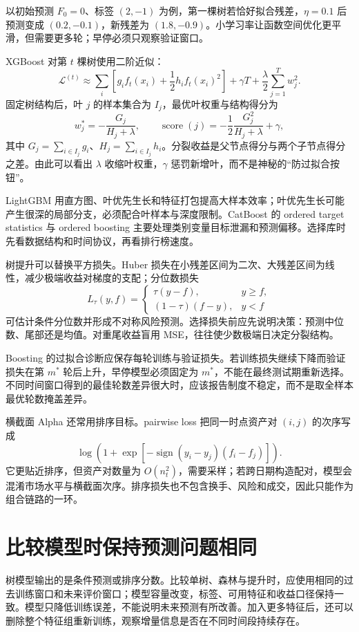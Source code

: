 

以初始预测 $F_0=0$、标签 $(2,-1)$ 为例，第一棵树若恰好拟合残差，$\eta=0.1$ 后预测变成 $(0.2,-0.1)$，新残差为 $(1.8,-0.9)$。小学习率让函数空间优化更平滑，但需要更多轮；早停必须只观察验证窗口。


XGBoost 对第 $t$ 棵树使用二阶近似\cite{chen2016xgboost}：
\[
\mathcal L^{(t)}\approx
\sum_i\left[g_i f_t(x_i)+\frac12h_i f_t(x_i)^2\right]
+\gamma T+\frac\lambda2\sum_{j=1}^T w_j^2.
\]
固定树结构后，叶 $j$ 的样本集合为 $I_j$，最优叶权重与结构得分为
\[
w_j^*=-\frac{G_j}{H_j+\lambda},\qquad
\operatorname{score}(j)=-\frac12\frac{G_j^2}{H_j+\lambda}+\gamma,
\]
其中 $G_j=\sum_{i\in I_j}g_i$、$H_j=\sum_{i\in I_j}h_i$。分裂收益是父节点得分与两个子节点得分之差。由此可以看出 $\lambda$ 收缩叶权重，$\gamma$ 惩罚新增叶，而不是神秘的“防过拟合按钮”。

LightGBM 用直方图、叶优先生长和特征打包提高大样本效率；叶优先生长可能产生很深的局部分支，必须配合叶样本与深度限制。CatBoost 的 ordered target statistics 与 ordered boosting 主要处理类别变量目标泄漏和预测偏移。选择库时先看数据结构和时间协议，再看排行榜速度。

树提升可以替换平方损失。Huber 损失在小残差区间为二次、大残差区间为线性，减少极端收益对梯度的支配；分位数损失
\[
L_\tau(y,f)=
\begin{cases}
\tau(y-f),&y\ge f,\\
(1-\tau)(f-y),&y<f
\end{cases}
\]
可估计条件分位数并形成不对称风险预测。选择损失前应先说明决策：预测中位数、尾部还是均值。对重尾收益盲用 MSE，往往使少数极端日决定分裂结构。

Boosting 的过拟合诊断应保存每轮训练与验证损失。若训练损失继续下降而验证损失在第 $m^*$ 轮后上升，早停模型必须固定为 $m^*$，不能在最终测试期重新选择。不同时间窗口得到的最佳轮数差异很大时，应该报告制度不稳定，而不是取全样本最优轮数掩盖差异。

横截面 Alpha 还常用排序目标。pairwise loss 把同一时点资产对 $(i,j)$ 的次序写成
\[
\log\!\left(1+\exp[-\operatorname{sign}(y_i-y_j)(f_i-f_j)]\right).
\]
它更贴近排序，但资产对数量为 $O(n_t^2)$，需要采样；若跨日期构造配对，模型会混淆市场水平与横截面次序。排序损失也不包含换手、风险和成交，因此只能作为组合链路的一环。

\section{比较模型时保持预测问题相同}
树模型输出的是条件预测或排序分数。比较单树、森林与提升时，应使用相同的过去训练窗口和未来评价窗口；模型容量改变，标签、可用特征和收益口径保持一致。模型只降低训练误差，不能说明未来预测有所改善。加入更多特征后，还可以删除整个特征组重新训练，观察增量信息是否在不同时间段持续存在。

